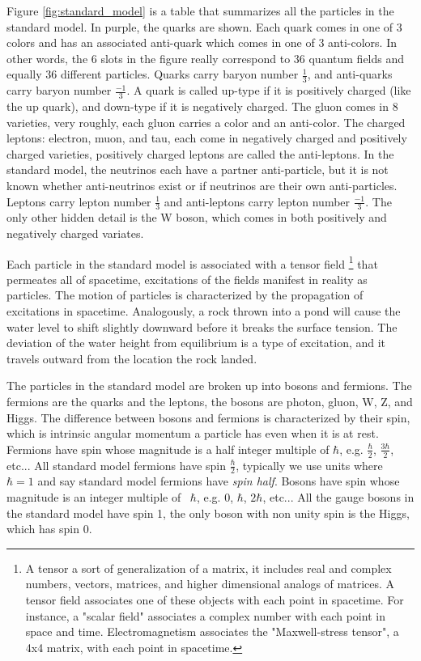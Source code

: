   Figure \ref{fig:standard_model} is a table that summarizes all the particles in the standard model. In purple, the quarks are shown. Each quark comes in one of 3 colors and has an associated anti-quark which comes in one of 3 anti-colors. In other words, the 6 slots in the figure really correspond to 36 quantum fields and equally 36 different particles. Quarks carry baryon number $\frac{1}{3}$, and anti-quarks carry baryon number $\frac{-1}{3}$. A quark is called up-type if it is positively charged (like the up quark), and down-type if it is negatively charged. The gluon comes in 8 varieties, very roughly, each gluon carries a color and an anti-color. The charged leptons: electron, muon, and tau, each come in negatively charged and positively charged varieties, positively charged leptons are called the anti-leptons. In the standard model, the neutrinos each have a partner anti-particle, but it is not known whether anti-neutrinos exist or if neutrinos are their own anti-particles. Leptons carry lepton number $\frac{1}{3}$ and anti-leptons carry lepton number $\frac{-1}{3}$. The only other hidden detail is the W boson, which comes in both positively and negatively charged variates.

  Each particle in the standard model is associated with a tensor field \footnote{A tensor a sort of generalization of a matrix, it includes real and complex numbers, vectors, matrices, and higher dimensional analogs of matrices. A tensor field associates one of these objects with each point in spacetime. For instance, a "scalar field" associates a complex number with each point in space and time. Electromagnetism associates the "Maxwell-stress tensor", a 4x4 matrix, with each point in spacetime.} that permeates all of spacetime, excitations of the fields manifest in reality as particles. The motion of particles is characterized by the propagation of excitations in spacetime. Analogously, a rock thrown into a pond will cause the water level to shift slightly downward before it breaks the surface tension. The deviation of the water height from equilibrium is a type of excitation, and it travels outward from the location the rock landed. 

  The particles in the standard model are broken up into bosons and fermions. The fermions are the quarks and the leptons, the bosons are photon, gluon, W, Z, and Higgs. The difference between bosons and fermions is characterized by their spin, which is intrinsic angular momentum a particle has even when it is at rest. Fermions have spin whose magnitude is a half integer multiple of $\hbar$, e.g. $\frac{\hbar}{2}$, $\frac{3\hbar}{2}$, etc... All standard model fermions have spin $\frac{\hbar}{2}$, typically we use units where ~$\hbar = 1$ and say standard model fermions have \emph{spin half}. Bosons have spin whose magnitude is an integer multiple of ~$\hbar$, e.g. 0, $\hbar$, $2\hbar$, etc... All the gauge bosons in the standard model have spin 1, the only boson with non unity spin is the Higgs, which has spin 0. 

